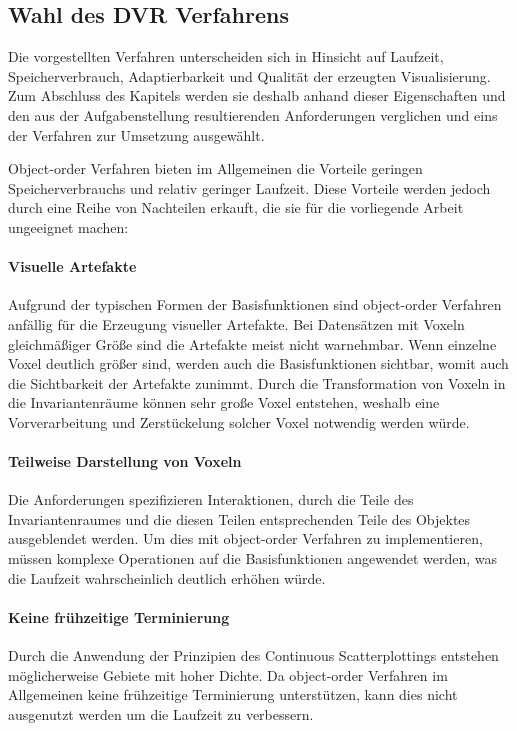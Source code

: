 \documentclass[a4paper,fontsize=12pt,toc=bib,halfparskip]{scrartcl}
\begin{document}
\subsection{Wahl des DVR Verfahrens}
Die vorgestellten Verfahren unterscheiden sich in Hinsicht auf Laufzeit, Speicherverbrauch, Adaptierbarkeit und Qualit\"at der erzeugten Visualisierung. Zum Abschluss des Kapitels werden sie deshalb anhand dieser Eigenschaften und den aus der Aufgabenstellung resultierenden Anforderungen verglichen und eins der Verfahren zur Umsetzung ausgew\"ahlt.

Object-order Verfahren bieten im Allgemeinen die Vorteile geringen Speicherverbrauchs und relativ geringer Laufzeit. Diese Vorteile werden jedoch durch eine Reihe von Nachteilen erkauft, die sie f\"ur die vorliegende Arbeit ungeeignet machen:


\paragraph{Visuelle Artefakte} Aufgrund der typischen Formen der Basisfunktionen sind object-order Verfahren anf\"allig f\"ur die Erzeugung visueller Artefakte. Bei Datens\"atzen mit Voxeln gleichm\"a{\ss}iger Gr\"o{\ss}e sind die Artefakte meist nicht warnehmbar. Wenn einzelne Voxel deutlich gr\"o{\ss}er sind, werden auch die Basisfunktionen sichtbar, womit auch die Sichtbarkeit der Artefakte zunimmt. Durch die Transformation von Voxeln in die Invariantenr\"aume k\"onnen sehr gro{\ss}e Voxel entstehen, weshalb eine Vorverarbeitung und Zerst\"uckelung solcher Voxel notwendig werden w\"urde.

\paragraph{Teilweise Darstellung von Voxeln} Die Anforderungen spezifizieren Interaktionen, durch die Teile des Invariantenraumes und die diesen Teilen entsprechenden Teile des Objektes ausgeblendet werden. Um dies mit object-order Verfahren zu implementieren, m\"ussen komplexe Operationen auf die Basisfunktionen angewendet werden, was die Laufzeit wahrscheinlich deutlich erh\"ohen w\"urde.

\paragraph{Keine fr\"uhzeitige Terminierung} Durch die Anwendung der Prinzipien des Continuous Scatterplottings entstehen m\"oglicherweise Gebiete mit hoher Dichte. Da object-order Verfahren im Allgemeinen keine fr\"uhzeitige Terminierung unterst\"utzen, kann dies nicht ausgenutzt werden um die Laufzeit zu verbessern.
\end{document}
